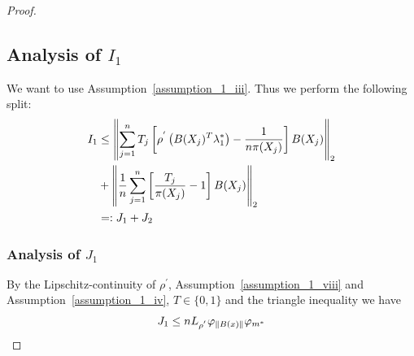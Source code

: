 \begin{proof}
\subsection*{Analysis of $I_1$}
We want to use Assumption~\ref{assumption_1_iii}.
Thus we perform the following split:
\begin{align}
  I_1 
  &\le
    \left\lVert
      \sum_{j = 1}^{n} 
        T_j  
      \left[ 
        \rho^{'} 
        \left( 
          B(X_j)^T \lambda^*_1
        \right)
      -
      \frac{1}{n \pi(X_j)}
      \right]
      B(X_j)
    \right\rVert_2
  \\
  &+
    \left\lVert
      \frac{1}{n}
      \sum_{j = 1}^{n} 
      \left[ 
        \frac{T_j}{\pi(X_j)}
      -
      1
      \right]
      B(X_j)
    \right\rVert_2
    \\
  &=:
  J_1 + J_2
\end{align}

\subsubsection*{Analysis of $J_1$}

By the Lipschitz-continuity of 
$\rho^{'}$,
Assumption~\ref{assumption_1_viii}
and
Assumption~\ref{assumption_1_iv},
$T \in \{0, 1\}$
and 
the triangle inequality 
we have
\begin{gather}
  J_1 
  \le
  n L_{\rho^{'}}\varphi_{\left\lVert B(x)\right\rVert} \varphi_{m^*}
\end{gather}


\end{proof}
